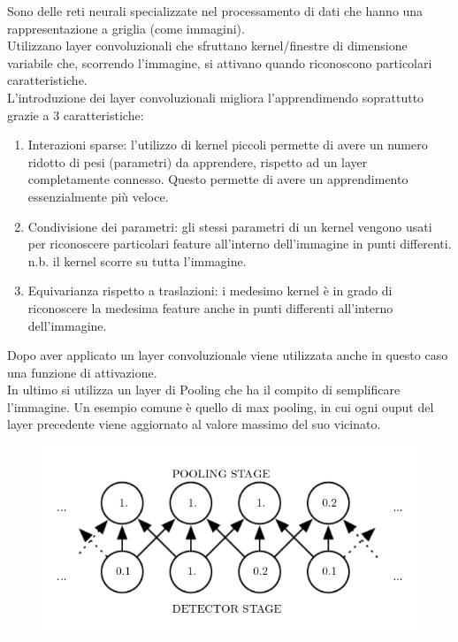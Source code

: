 \documentclass[12pt]{article}
\begin{document}
Sono delle reti neurali specializzate nel processamento
di dati che hanno una rappresentazione a griglia (come immagini).\\
Utilizzano layer convoluzionali che sfruttano kernel/finestre di
dimensione variabile che, scorrendo l'immagine, si attivano quando
riconoscono particolari caratteristiche.\\
L'introduzione dei layer convoluzionali migliora l'apprendimendo
soprattutto grazie a 3 caratteristiche:
\begin{enumerate}
    \item Interazioni sparse: l'utilizzo di kernel piccoli
    permette di avere un numero ridotto di pesi (parametri) da
    apprendere, rispetto ad un layer completamente connesso.
    Questo permette di avere un apprendimento essenzialmente
    più veloce.
    \item Condivisione dei parametri: gli stessi parametri di 
    un kernel vengono usati per riconoscere particolari feature
    all'interno dell'immagine in punti differenti.
    n.b. il kernel scorre su tutta l'immagine.
    \item Equivarianza rispetto a traslazioni: i medesimo
    kernel è in grado di riconoscere la medesima feature anche
    in punti differenti all'interno dell'immagine.
\end{enumerate}

Dopo aver applicato un layer convoluzionale viene utilizzata 
anche in questo caso una funzione di attivazione.\\
In ultimo si utilizza un layer di Pooling che ha il compito di
semplificare l'immagine. Un esempio comune è quello
di max pooling, in cui ogni ouput del layer precedente viene
aggiornato al valore massimo del suo vicinato.

\begin{figure}[H]{}
    \centering
    \includegraphics[scale=2.5]{../images/pooling.png}
    \label{fig:cc}
\end{figure}
\end{document}
